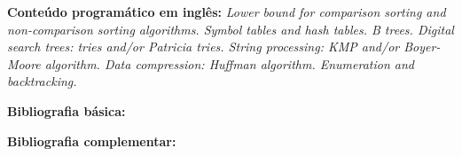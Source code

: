 \documentclass[class=article, crop=false]{standalone}
\begin{document}
\textbf{Conteúdo programático em inglês:}
\textit{Lower bound for comparison sorting and non-comparison sorting algorithms.
Symbol tables and hash tables.
B trees.
Digital search trees: tries and/or Patricia tries.
String processing: KMP and/or Boyer-Moore algorithm.
Data compression: Huffman algorithm.
Enumeration and backtracking.}

\newrefsection
\textbf{Bibliografia básica:}
\nocite{1998-sedgewick, 2012-cormen-etal, 2010-szwarcfiter-markenzon}
\printbibliography

\newrefsection
\textbf{Bibliografia complementar:}
\nocite{2007-ziviani, 1995-tenenbaum-etal, 2011-sedgewick-wayne, 2002-cormen-etal}
\printbibliography
\end{document}
